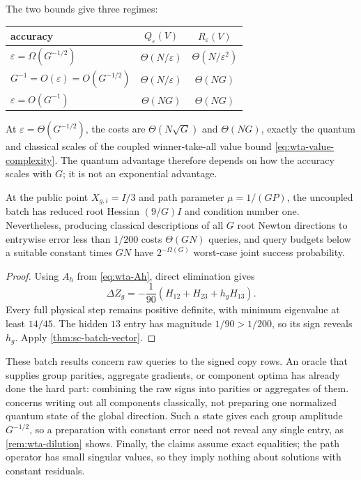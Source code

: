 The two bounds give three regimes:
\begin{center}
\begin{tabular}{@{}lcc@{}}
\toprule
accuracy & $Q_\varepsilon(V)$ & $R_\varepsilon(V)$ \\ \midrule
$\varepsilon=\Omega(G^{-1/2})$
 & $\Theta(N/\varepsilon)$ & $\Theta(N/\varepsilon^2)$ \\
$G^{-1}=O(\varepsilon)=O(G^{-1/2})$
 & $\Theta(N/\varepsilon)$ & $\Theta(NG)$ \\
$\varepsilon=O(G^{-1})$
 & $\Theta(NG)$ & $\Theta(NG)$ \\
\bottomrule
\end{tabular}
\end{center}
At $\varepsilon=\Theta(G^{-1/2})$, the costs are
$\Theta(N\sqrt G)$ and $\Theta(NG)$, exactly the quantum and classical
scales of the coupled winner-take-all value bound
\eqref{eq:wta-value-complexity}.  The quantum advantage therefore depends on how the accuracy scales with
$G$; it is not an exponential advantage.

\begin{corollary}
\label{cor:sc-parallel-newton}
At the public point $X_{g,i}=I/3$ and path parameter
$\mu=1/(GP)$, the uncoupled batch has reduced root Hessian $(9/G)I$ and
condition number one.  Nevertheless, producing classical descriptions of
all $G$ root Newton directions to entrywise error less than $1/200$ costs
$\Theta(GN)$ queries, and query budgets below a suitable constant times $GN$ have
$2^{-\Omega(G)}$ worst-case joint success probability.
\end{corollary}

\begin{proof}
Using $A_h$ from \eqref{eq:wta-Ah}, direct elimination gives
\[
 \Delta Z_g=-\frac1{90}(H_{12}+H_{23}+h_gH_{13}).
\]
Every full physical step remains positive definite, with minimum eigenvalue
at least $14/45$.  The hidden $13$ entry has magnitude $1/90>1/200$, so its
sign reveals $h_g$.  Apply \cref{thm:sc-batch-vector}.
\end{proof}

These batch results concern raw queries to the signed copy rows.  An
oracle that supplies group parities, aggregate gradients, or component
optima has already done the hard part: combining the raw signs into
parities or aggregates of them.
 concerns writing out all components classically,
not preparing one normalized quantum state of the global direction.  Such a
state gives each group amplitude $G^{-1/2}$, so a preparation with constant
error need not reveal any single entry, as \cref{rem:wta-dilution} shows.  Finally, the claims assume exact
equalities; the path operator has small singular values, so they imply
nothing about solutions with constant residuals.

